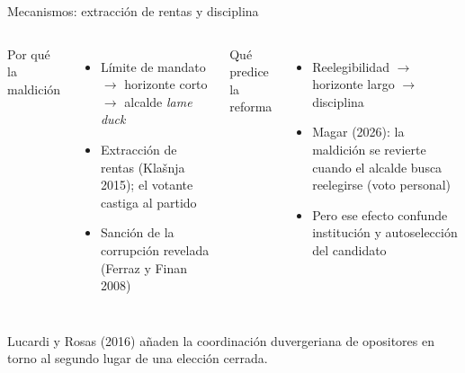 \documentclass[
  aspectratio=43,        %
  t,                     %
  10pt                   %
]{beamer}
\begin{document}
\begin{frame}{Mecanismos: extracción de rentas y disciplina}

  \begin{columns}[T]

    \textcolor{ITAMgreen}{Por qué la maldición}
    \vspace{0.3em}
    \begin{itemize}
      \item Límite de mandato $\rightarrow$ horizonte corto $\rightarrow$ alcalde
            \emph{lame duck}
      \item Extracción de rentas (Klašnja 2015); el votante castiga al partido
      \item Sanción de la corrupción revelada (Ferraz y Finan 2008)
    \end{itemize}

    \textcolor{ITAMmaroon}{Qué predice la reforma}
    \vspace{0.3em}
    \begin{itemize}
      \item Reelegibilidad $\rightarrow$ horizonte largo $\rightarrow$ disciplina
      \item Magar (2026): la maldición se revierte cuando el alcalde busca
            reelegirse (voto personal)
      \item Pero ese efecto confunde institución y autoselección del candidato
    \end{itemize}

  \end{columns}

  \vspace{0.6em}
  {\footnotesize \textcolor{ITAMgray}{%
    Lucardi y Rosas (2016) añaden la coordinación duvergeriana de opositores
    en torno al segundo lugar de una elección cerrada.}}

\end{frame}
\end{document}
